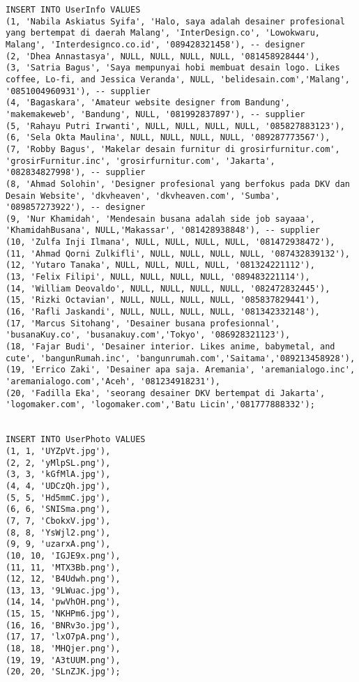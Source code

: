 \begin{lstlisting}
INSERT INTO UserInfo VALUES
(1, 'Nabila Askiatus Syifa', 'Halo, saya adalah desainer profesional yang bertempat di daerah Malang', 'InterDesign.co', 'Lowokwaru, Malang', 'Interdesignco.co.id', '089428321458'), -- designer
(2, 'Dhea Annastasya', NULL, NULL, NULL, NULL, '081458928444'),
(3, 'Satria Bagus', 'Saya mempunyai hobi membuat desain logo. Likes coffee, Lo-fi, and Jessica Veranda', NULL, 'belidesain.com','Malang', '0851004960931'), -- supplier
(4, 'Bagaskara', 'Amateur website designer from Bandung', 'makemakeweb', 'Bandung', NULL, '081992837897'), -- supplier
(5, 'Rahayu Putri Irwanti', NULL, NULL, NULL, NULL, '085827883123'),
(6, 'Sela Okta Maulina', NULL, NULL, NULL, NULL, '089287773567'),
(7, 'Robby Bagus', 'Makelar desain furnitur di grosirfurnitur.com', 'grosirFurnitur.inc', 'grosirfurnitur.com', 'Jakarta', '082834827998'), -- supplier
(8, 'Ahmad Solohin', 'Designer profesional yang berfokus pada DKV dan Desain Website', 'dkvheaven', 'dkvheaven.com', 'Sumba', '089857273922'), -- designer
(9, 'Nur Khamidah', 'Mendesain busana adalah side job sayaaa', 'KhamidahBusana', NULL,'Makassar', '081428938848'), -- supplier
(10, 'Zulfa Inji Ilmana', NULL, NULL, NULL, NULL, '081472938472'),
(11, 'Ahmad Qorni Zulkifli', NULL, NULL, NULL, NULL, '087432839132'),
(12, 'Yutaro Tanaka', NULL, NULL, NULL, NULL, '081324221112'),
(13, 'Felix Filipi', NULL, NULL, NULL, NULL, '089483221114'),
(14, 'William Deovaldo', NULL, NULL, NULL, NULL, '082472832445'),
(15, 'Rizki Octavian', NULL, NULL, NULL, NULL, '085837829441'),
(16, 'Rafli Jaskandi', NULL, NULL, NULL, NULL, '081342332148'),
(17, 'Marcus Sitohang', 'Desainer busana profesionnal', 'busanaKuy.co', 'busanakuy.com','Tokyo', '086928321123'),
(18, 'Fajar Budi', 'Desainer interior. Likes anime, babymetal, and cute', 'bangunRumah.inc', 'bangunrumah.com','Saitama','089213458928'),
(19, 'Errico Zaki', 'Desainer apa saja. Aremania', 'aremanialogo.inc', 'aremanialogo.com','Aceh', '081234918231'),
(20, 'Fadilla Eka', 'seorang desainer DKV bertempat di Jakarta', 'logomaker.com', 'logomaker.com','Batu Licin','081777888332');


INSERT INTO UserPhoto VALUES
(1, 1, 'UYZpVt.jpg'),
(2, 2, 'yMlpSL.png'),
(3, 3, 'kGfMlA.jpg'),
(4, 4, 'UDCzQh.jpg'),
(5, 5, 'Hd5mmC.jpg'),
(6, 6, 'SNISma.png'),
(7, 7, 'CbokxV.jpg'),
(8, 8, 'YsWjl2.png'),
(9, 9, 'uzarxA.png'),
(10, 10, 'IGJE9x.png'),
(11, 11, 'MTX3Bb.png'),
(12, 12, 'B4Udwh.png'),
(13, 13, '9LWuac.jpg'),
(14, 14, 'pwVhOH.png'),
(15, 15, 'NKHPm6.jpg'),
(16, 16, 'BNRv3o.jpg'),
(17, 17, 'lxO7pA.png'),
(18, 18, 'MHQjer.png'),
(19, 19, 'A3tUUM.png'),
(20, 20, 'SLnZJK.jpg');


\end{lstlisting}

